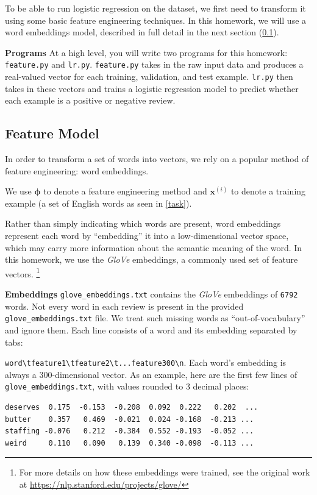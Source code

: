\documentclass[11pt,addpoints,answers]{exam}
\newcommand{\xv}{\mathbf{x}}
\begin{document}
To be able to run logistic regression on the dataset, we first need to transform it using some basic feature engineering techniques. In this homework, we will use a word embeddings model, described in full detail in the next section (\ref{featuremodels}).

{\bf Programs } 
At a high level, you will write two programs for this homework: \texttt{feature.py} and \texttt{lr.py}. \texttt{feature.py} takes in the raw input data and produces a real-valued vector for each training, validation, and test example. \texttt{lr.py} then takes in these vectors and trains a logistic regression model to predict whether each example is a positive or negative review.


\subsection{Feature Model}\label{featuremodels}
In order to transform a set of words into vectors, we rely on a popular method of feature engineering: word embeddings.

We use $\boldsymbol{\phi}$ to denote a feature engineering method and $\xv^{(i)}$ to denote a training example (a set of English words as seen in \ref{task}).

Rather than simply indicating which words are present, word embeddings represent each word by ``embedding'' it into a low-dimensional vector space, which may carry more information about the semantic meaning of the word. In this homework, we use the \emph{GloVe} embeddings, a commonly used set of feature vectors. \footnote{For more details on how these embeddings were trained, see the original work at   \url{https://nlp.stanford.edu/projects/glove/}}

{\bf Embeddings }
\texttt{glove\_embeddings.txt} contains the \emph{GloVe} embeddings of \texttt{6792} words. 
Not every word in each review is present in the provided \texttt{glove\_embeddings.txt} file. We treat such missing words as ``out-of-vocabulary'' and ignore them. Each line consists of a word and its embedding separated by tabs:

\lstinline{word\tfeature1\tfeature2\t...feature300\n}. Each word's embedding is always a 300-dimensional vector. As an example, here are the first few lines of \texttt{glove\_embeddings.txt}, with values rounded to 3 decimal places:
\begin{lstlisting}
deserves  0.175  -0.153  -0.208  0.092  0.222   0.202  ...
butter    0.357   0.469  -0.021  0.024 -0.168  -0.213 ...
staffing -0.076   0.212  -0.384  0.552 -0.193  -0.052 ...
weird     0.110   0.090   0.139  0.340 -0.098  -0.113 ...     
\end{lstlisting}
\end{document}
